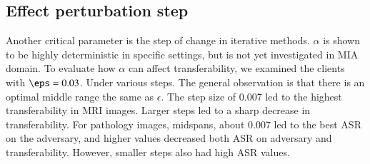 















\subsection{Effect perturbation step}


Another critical parameter is the step of change in iterative methods. {$\alpha$} is shown to be highly deterministic in specific settings, but is not yet investigated in MIA domain. To evaluate how $\alpha$ can affect transferability, we examined the clients with $\eps=0.03$. Under various steps. The general observation is that there is an optimal middle range the same as $\epsilon$. The step size of 0.007 led to the highest transferability in MRI images. Larger steps led to a sharp decrease in transferability. For pathology images, midspans, about 0.007 led to the best ASR on the adversary, and higher values decreased both ASR on adversary and transferability. However, smaller steps also had high ASR values. 







